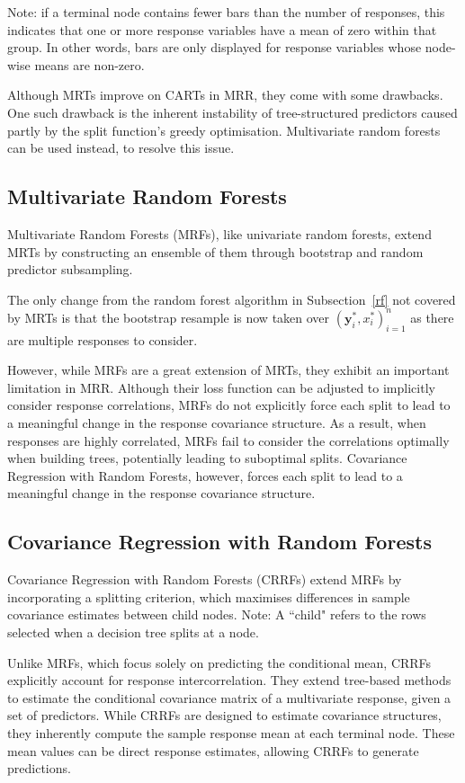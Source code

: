 \documentclass[11pt]{report} %
\begin{document}
\noindent Note: if a terminal node contains fewer bars than the number of responses, this indicates that one or more response variables have a mean of zero within that group. In other words, bars are only displayed for response variables whose node-wise means are non-zero.


Although MRTs improve on CARTs in MRR, they come with some drawbacks. One such drawback is the inherent instability of tree-structured predictors caused partly by the split function's greedy optimisation.\cite{questier2005cart} Multivariate random forests can be used instead, to resolve this issue.

\subsection{Multivariate Random Forests}
Multivariate Random Forests (MRFs), like univariate random forests, extend MRTs by constructing an ensemble of them through bootstrap and random predictor subsampling.\cite{segal2011multivariate}

The only change from the random forest algorithm in Subsection~\ref{rf} not covered by MRTs is that the bootstrap resample is now taken over \((\mathbf{y}_i^*, x_i^*)_{i=1}^n\) as there are multiple responses to consider.

However, while MRFs are a great extension of MRTs, they exhibit an important limitation in MRR. Although their loss function can be adjusted to implicitly consider response correlations, MRFs do not explicitly force each split to lead to a meaningful change in the response covariance structure. As a result, when responses are highly correlated, MRFs
fail to consider the correlations optimally when building trees, potentially leading to suboptimal splits.\cite{segal2011multivariate} Covariance Regression with Random Forests, however, forces each split to lead to a meaningful change in the response covariance structure.

\subsection{Covariance Regression with Random Forests}
Covariance Regression with Random Forests (CRRFs) extend MRFs by incorporating a splitting criterion, which maximises differences in sample covariance estimates between child nodes. 
\noindent Note: A ``child" refers to the rows selected when a decision tree splits at a node.

Unlike MRFs, which focus solely on predicting the conditional mean, CRRFs explicitly account for response intercorrelation. They extend tree-based methods to estimate the conditional covariance matrix of a multivariate response, given a set of predictors.\cite{alakus2023covariance} While CRRFs are designed to estimate covariance structures, they inherently compute the sample response mean at each terminal node. These mean values can be direct response estimates, allowing CRRFs to generate predictions.
\end{document}
